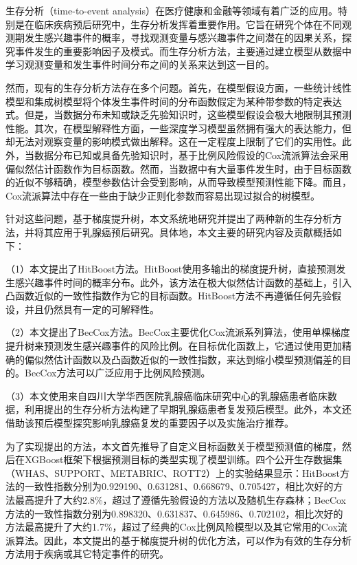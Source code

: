 	
\begin{chineseabstract}
    生存分析（time-to-event analysis）在医疗健康和金融等领域有着广泛的应用。特别是在临床疾病预后研究中，生存分析发挥着重要作用。它旨在研究个体在不同观测期发生感兴趣事件的概率，寻找观测变量与感兴趣事件之间潜在的因果关系，探究事件发生的重要影响因子及模式。而生存分析方法，主要通过建立模型从数据中学习观测变量和发生事件时间分布之间的关系来达到这一目的。

    然而，现有的生存分析方法存在多个问题。首先，在模型假设方面，一些统计线性模型和集成树模型将个体发生事件时间的分布函数假定为某种带参数的特定表达式。但是，当数据分布未知或缺乏先验知识时，这些模型假设会极大地限制其预测性能。其次，在模型解释性方面，一些深度学习模型虽然拥有强大的表达能力，但却无法对观察变量的影响模式做出解释。这在一定程度上限制了它们的实用性。此外，当数据分布已知或具备先验知识时，基于比例风险假设的Cox流派算法会采用偏似然估计函数作为目标函数。然而，当数据中有大量事件发生时，由于目标函数的近似不够精确，模型参数估计会受到影响，从而导致模型预测性能下降。而且，Cox流派算法中存在一些由于缺少正则化参数而容易出现过拟合的树模型。

    针对这些问题，基于梯度提升树，本文系统地研究并提出了两种新的生存分析方法，并将其应用于乳腺癌预后研究。具体地，本文主要的研究内容及贡献概括如下：

    （1）本文提出了HitBoost方法。HitBoost使用多输出的梯度提升树，直接预测发生感兴趣事件时间的概率分布。此外，该方法在极大似然估计函数的基础上，引入凸函数近似的一致性指数作为它的目标函数。HitBoost方法不再遵循任何先验假设，并且仍然具有一定的可解释性。
    
    （2）本文提出了BecCox方法。BecCox主要优化Cox流派系列算法，使用单棵梯度提升树来预测发生感兴趣事件的风险比例。在目标优化函数上，它通过使用更加精确的偏似然估计函数以及凸函数近似的一致性指数，来达到缩小模型预测偏差的目的。BecCox方法可以广泛应用于比例风险预测。
    
    （3）本文使用来自四川大学华西医院乳腺癌临床研究中心的乳腺癌患者临床数据，利用提出的生存分析方法构建了早期乳腺癌患者复发预后模型。此外，本文还借助该预后模型探究影响乳腺癌复发的重要因子以及实施治疗推荐。

    为了实现提出的方法，本文首先推导了自定义目标函数关于模型预测值的梯度，然后在XGBoost框架下根据预测目标的类型实现了模型训练。四个公开生存数据集（WHAS、SUPPORT、METABRIC、ROTT2）上的实验结果显示：HitBoost方法的一致性指数分别为0.929190、0.631281、0.668679、0.705427，相比次好的方法最高提升了大约2.8\%，超过了遵循先验假设的方法以及随机生存森林；BecCox方法的一致性指数分别为0.898320、0.631837、0.645986、0.702102，相比次好的方法最高提升了大约1.7\%，超过了经典的Cox比例风险模型以及其它常用的Cox流派算法。因此，本文提出的基于梯度提升树的优化方法，可以作为有效的生存分析方法用于疾病或其它特定事件的研究。

\end{chineseabstract}

